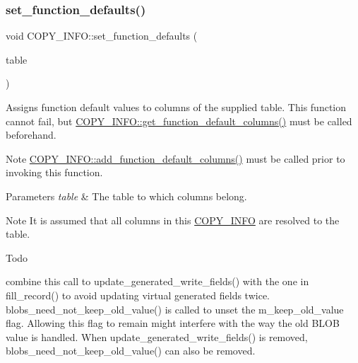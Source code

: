 \subsubsection{\texorpdfstring{set\+\_\+function\+\_\+defaults()}{set\_function\_defaults()}}
{\footnotesize\ttfamily void C\+O\+P\+Y\+\_\+\+I\+N\+F\+O\+::set\+\_\+function\+\_\+defaults (\begin{DoxyParamCaption}\item[{\mbox{\hyperlink{structTABLE}{T\+A\+B\+LE}} $\ast$}]{table }\end{DoxyParamCaption})\hspace{0.3cm}{\ttfamily [virtual]}}

Assigns function default values to columns of the supplied table. This function cannot fail, but \mbox{\hyperlink{classCOPY__INFO_a4b096071d98443d6f9a59aafc6da78a0}{C\+O\+P\+Y\+\_\+\+I\+N\+F\+O\+::get\+\_\+function\+\_\+default\+\_\+columns()}} must be called beforehand.

\begin{DoxyNote}{Note}
\mbox{\hyperlink{classCOPY__INFO_ae3d8192214b05dc110801ec8dd999edc}{C\+O\+P\+Y\+\_\+\+I\+N\+F\+O\+::add\+\_\+function\+\_\+default\+\_\+columns()}} must be called prior to invoking this function.
\end{DoxyNote}

\begin{DoxyParams}{Parameters}
{\em table} & The table to which columns belong.\\
\hline
\end{DoxyParams}
\begin{DoxyNote}{Note}
It is assumed that all columns in this \mbox{\hyperlink{classCOPY__INFO}{C\+O\+P\+Y\+\_\+\+I\+N\+FO}} are resolved to the table. 
\end{DoxyNote}
\begin{DoxyRefDesc}{Todo}
\item[\mbox{\hyperlink{todo__todo000077}{Todo}}]combine this call to update\+\_\+generated\+\_\+write\+\_\+fields() with the one in fill\+\_\+record() to avoid updating virtual generated fields twice. blobs\+\_\+need\+\_\+not\+\_\+keep\+\_\+old\+\_\+value() is called to unset the m\+\_\+keep\+\_\+old\+\_\+value flag. Allowing this flag to remain might interfere with the way the old B\+L\+OB value is handled. When update\+\_\+generated\+\_\+write\+\_\+fields() is removed, blobs\+\_\+need\+\_\+not\+\_\+keep\+\_\+old\+\_\+value() can also be removed. \end{DoxyRefDesc}


